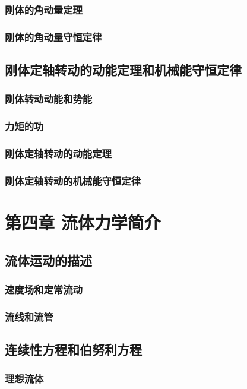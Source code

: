     \subsection{刚体的角动量定理}
    \subsection{刚体的角动量守恒定律}

\section{刚体定轴转动的动能定理和机械能守恒定律}
    \subsection{刚体转动动能和势能}
    \subsection{力矩的功}
    \subsection{刚体定轴转动的动能定理}
    \subsection{刚体定轴转动的机械能守恒定律}

\chapter{第四章 流体力学简介}

\section{流体运动的描述}
    \subsection{速度场和定常流动}
    \subsection{流线和流管}

\section{连续性方程和伯努利方程}
    \subsection{理想流体}
